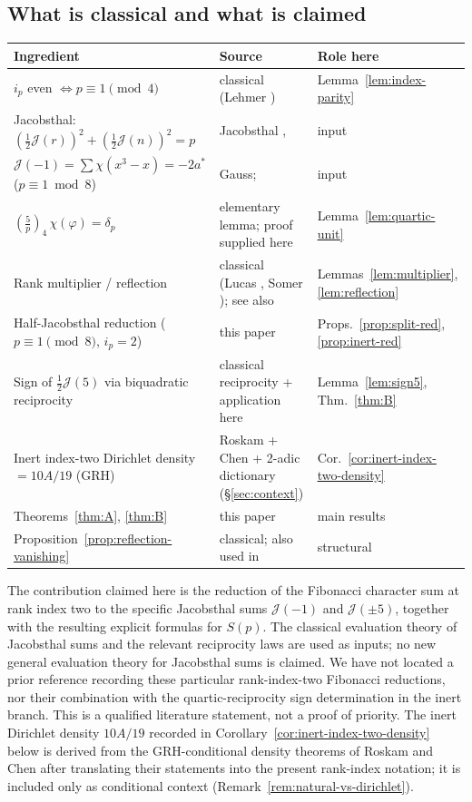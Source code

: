 \documentclass[11pt]{amsart}
\theoremstyle{plain}
\theoremstyle{definition}
\newcommand{\qleg}[2]{\left(\frac{#1}{#2}\right)_{\!4}}
\newcommand{\Jac}{\mathcal{J}}
\begin{document}
\subsection{What is classical and what is claimed}
\begin{center}
\begin{tabular}{@{}p{}p{}p{}@{}}
\toprule
Ingredient & Source & Role here\\
\midrule
$i_p$ even $\iff p\equiv1\pmod4$ & classical (Lehmer \cite{DHLehmer}) & Lemma~\ref{lem:index-parity}\\
Jacobsthal: $(\tfrac12\Jac(r))^2+(\tfrac12\Jac(n))^2=p$ & Jacobsthal \cite{Jacobsthal}, \cite{BEW} & input\\
$\Jac(-1)=\sum\chi(x^3-x)=-2a^{*}$ ($p\equiv1\bmod 8$) & Gauss; \cite[Ch.~6,9]{BEW} & input\\
$\qleg5p\,\chi(\varphi)=\delta_p$ & elementary lemma; proof supplied here & Lemma~\ref{lem:quartic-unit}\\
Rank multiplier / reflection & classical (Lucas \cite{Lucas1878}, Somer \cite{Somer1980}); see also \cite{Ghandali2026HalfPeriod} & Lemmas~\ref{lem:multiplier}, \ref{lem:reflection}\\
Half-Jacobsthal reduction ($p\equiv1\pmod8$, $i_p=2$) & this paper & Props.~\ref{prop:split-red}, \ref{prop:inert-red}\\
Sign of $\tfrac12\Jac(5)$ via biquadratic reciprocity & classical reciprocity + application here & Lemma~\ref{lem:sign5}, Thm.~\ref{thm:B}\\
Inert index-two Dirichlet density $=10A/19$ (GRH) & Roskam \cite{Roskam2000} + Chen \cite{Chen2002} + 2-adic dictionary (\S\ref{sec:context}) & Cor.~\ref{cor:inert-index-two-density}\\
Theorems~\ref{thm:A}, \ref{thm:B} & this paper & main results\\
Proposition~\ref{prop:reflection-vanishing} & classical; also used in \cite{Ghandali2026HalfPeriod} & structural\\
\bottomrule
\end{tabular}
\end{center}
\noindent
The contribution claimed here is the reduction of the Fibonacci
character sum at rank index two to the specific Jacobsthal sums
$\Jac(-1)$ and $\Jac(\pm5)$, together with the resulting explicit
formulas for $S(p)$.  The classical evaluation theory of Jacobsthal
sums and the relevant reciprocity laws are used as inputs; no new
general evaluation theory for Jacobsthal sums is claimed.
We have not located a prior reference recording these particular
rank-index-two Fibonacci reductions, nor their combination with the
quartic-reciprocity sign determination in the inert branch.  This is a
qualified literature statement, not a proof of priority.  The inert Dirichlet
density $10A/19$ recorded in Corollary~\ref{cor:inert-index-two-density}
below is derived from the GRH-conditional density theorems of Roskam and
Chen after translating their statements into the present rank-index
notation; it is included only as conditional context
(Remark~\ref{rem:natural-vs-dirichlet}).
\end{document}
